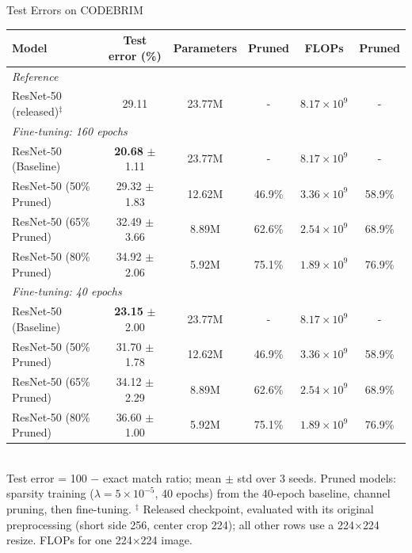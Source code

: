 \begin{table}[t]
\centering
{\small Test Errors on CODEBRIM}\\[2pt]
\begin{tabular}{l|c|c|c|c|c}
\hline
Model & Test error (\%) & Parameters & Pruned & FLOPs & Pruned \\
\hline
\multicolumn{6}{l}{\textit{Reference}} \\
ResNet-50 (released)$^\ddagger$ & 29.11 & 23.77M & - & $8.17\times10^{9}$ & - \\
\hline
\multicolumn{6}{l}{\textit{Fine-tuning: 160 epochs}} \\
ResNet-50 (Baseline) & \textbf{20.68} {\scriptsize$\pm$1.11} & 23.77M & - & $8.17\times10^{9}$ & - \\
ResNet-50 (50\% Pruned) & 29.32 {\scriptsize$\pm$1.83} & 12.62M & 46.9\% & $3.36\times10^{9}$ & 58.9\% \\
ResNet-50 (65\% Pruned) & 32.49 {\scriptsize$\pm$3.66} & 8.89M & 62.6\% & $2.54\times10^{9}$ & 68.9\% \\
ResNet-50 (80\% Pruned) & 34.92 {\scriptsize$\pm$2.06} & 5.92M & 75.1\% & $1.89\times10^{9}$ & 76.9\% \\
\hline
\multicolumn{6}{l}{\textit{Fine-tuning: 40 epochs}} \\
ResNet-50 (Baseline) & \textbf{23.15} {\scriptsize$\pm$2.00} & 23.77M & - & $8.17\times10^{9}$ & - \\
ResNet-50 (50\% Pruned) & 31.70 {\scriptsize$\pm$1.78} & 12.62M & 46.9\% & $3.36\times10^{9}$ & 58.9\% \\
ResNet-50 (65\% Pruned) & 34.12 {\scriptsize$\pm$2.29} & 8.89M & 62.6\% & $2.54\times10^{9}$ & 68.9\% \\
ResNet-50 (80\% Pruned) & 36.60 {\scriptsize$\pm$1.00} & 5.92M & 75.1\% & $1.89\times10^{9}$ & 76.9\% \\
\hline
\end{tabular}
\\[2pt]
{\scriptsize Test error = 100 $-$ exact match ratio; mean $\pm$ std over 3 seeds.  Pruned models: sparsity training ($\lambda = 5\times10^{-5}$, 40 epochs) from the 40-epoch baseline, channel pruning, then fine-tuning.  $^\ddagger$ Released checkpoint, evaluated with its original preprocessing (short side 256, center crop 224); all other rows use a 224$\times$224 resize.  FLOPs for one 224$\times$224 image.}
\end{table}
